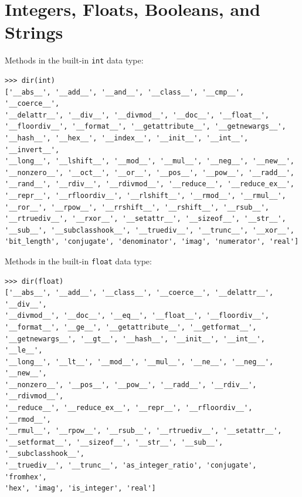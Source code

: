 \documentclass[8pt,a4paper,compress,handout]{beamer}
\begin{document}
\section{Integers, Floats, Booleans, and Strings}
\begin{frame}[fragile]
Methods in the built-in \lstinline{int} data type:
\begin{lstlisting}[language={}]
>>> dir(int) 
['__abs__', '__add__', '__and__', '__class__', '__cmp__', '__coerce__', 
'__delattr__', '__div__', '__divmod__', '__doc__', '__float__', 
'__floordiv__', '__format__', '__getattribute__', '__getnewargs__', 
'__hash__', '__hex__', '__index__', '__init__', '__int__', '__invert__', 
'__long__', '__lshift__', '__mod__', '__mul__', '__neg__', '__new__', 
'__nonzero__', '__oct__', '__or__', '__pos__', '__pow__', '__radd__', 
'__rand__', '__rdiv__', '__rdivmod__', '__reduce__', '__reduce_ex__', 
'__repr__', '__rfloordiv__', '__rlshift__', '__rmod__', '__rmul__', 
'__ror__', '__rpow__', '__rrshift__', '__rshift__', '__rsub__', 
'__rtruediv__', '__rxor__', '__setattr__', '__sizeof__', '__str__', 
'__sub__', '__subclasshook__', '__truediv__', '__trunc__', '__xor__', 
'bit_length', 'conjugate', 'denominator', 'imag', 'numerator', 'real']
\end{lstlisting}

\bigskip

Methods in the built-in \lstinline{float} data type:
\begin{lstlisting}[language={}]
>>> dir(float) 
['__abs__', '__add__', '__class__', '__coerce__', '__delattr__', '__div__', 
'__divmod__', '__doc__', '__eq__', '__float__', '__floordiv__', 
'__format__', '__ge__', '__getattribute__', '__getformat__', 
'__getnewargs__', '__gt__', '__hash__', '__init__', '__int__', '__le__', 
'__long__', '__lt__', '__mod__', '__mul__', '__ne__', '__neg__', '__new__', 
'__nonzero__', '__pos__', '__pow__', '__radd__', '__rdiv__', '__rdivmod__', 
'__reduce__', '__reduce_ex__', '__repr__', '__rfloordiv__', '__rmod__', 
'__rmul__', '__rpow__', '__rsub__', '__rtruediv__', '__setattr__', 
'__setformat__', '__sizeof__', '__str__', '__sub__', '__subclasshook__', 
'__truediv__', '__trunc__', 'as_integer_ratio', 'conjugate', 'fromhex', 
'hex', 'imag', 'is_integer', 'real']
\end{lstlisting}
\end{frame}
\end{document}
